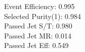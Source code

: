 Event Efficiency:   0.995\\ 
Selected Purity(1): 0.984\\ 
Passed Jet S/T:     0.980\\ 
Passed Jet MR:      0.014\\ 
Passed Jet Eff:     0.549
